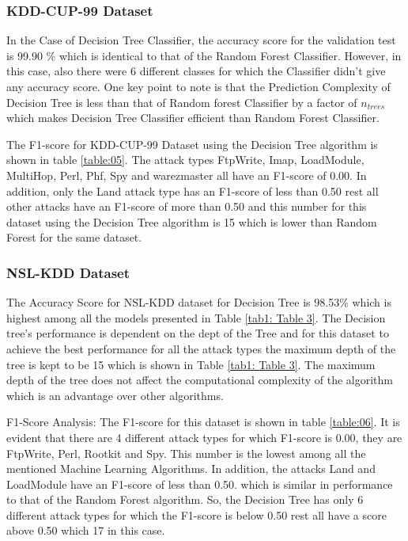 \documentclass[conference]{IEEEtran}
\begin{document}
\subsubsection{KDD-CUP-99 Dataset}

In the Case of Decision Tree Classifier, the accuracy score for the validation test is 99.90 \% which is identical to that of the Random Forest Classifier. However, in this case, also there were 6 different classes for which the Classifier didn't give any accuracy score. One key point to note is that the Prediction Complexity of Decision Tree is less than that of Random forest Classifier by a factor of $n_{trees}$ which makes Decision Tree Classifier efficient than Random Forest Classifier.  

The F1-score for KDD-CUP-99 Dataset using the Decision Tree algorithm is shown in table \ref{table:05}. The attack types FtpWrite, Imap, LoadModule, MultiHop, Perl, Phf, Spy and warezmaster all have an F1-score of 0.00. In addition, only the Land attack type has an F1-score of less than 0.50 rest all other attacks have an F1-score of more than 0.50 and this number for this dataset using the Decision Tree algorithm is 15 which is lower than Random Forest for the same dataset.

\subsubsection{NSL-KDD Dataset}

The Accuracy Score for NSL-KDD dataset \cite{KDDcup99} for Decision Tree is 98.53\% which is highest among all the models presented in Table \ref{tab1: Table 3}. The Decision tree's performance is dependent on the dept of the Tree and for this dataset to achieve the best performance for all the attack types the maximum depth of the tree is kept to be 15 which is shown in Table \ref{tab1: Table 3}. The maximum depth of the tree does not affect the computational complexity of the algorithm which is an advantage over other algorithms.   

F1-Score Analysis: 
The F1-score for this dataset is shown in table \ref{table:06}. It is evident that there are 4 different attack types for which F1-score is 0.00, they are FtpWrite, Perl, Rootkit and Spy. This number is the lowest among all the mentioned Machine Learning Algorithms. In addition, the attacks Land and LoadModule have an F1-score of less than 0.50. which is similar in performance to that of the Random Forest algorithm. So, the Decision Tree has only 6 different attack types for which the F1-score is below 0.50 rest all have a score above 0.50 which 17 in this case.  
\end{document}
